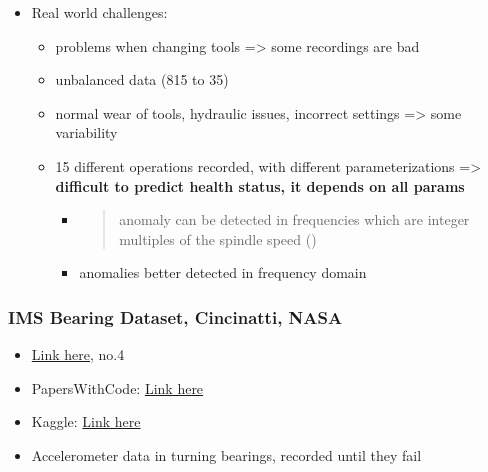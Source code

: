 \documentclass[
  letterpaper,
  DIV=11,
  numbers=noendperiod]{scrartcl}
\providecommand{\tightlist}{%
  \setlength{\itemsep}{0pt}\setlength{\parskip}{0pt}}
\begin{document}
\begin{itemize}
  \begin{itemize}
  \tightlist
  \item
    \textbf{Tsfresh}: automatic package to extract standard features
    from time series, open source,
    \href{https://tsfresh.readthedocs.io/en/latest/}{here},
    \href{https://www.sciencedirect.com/science/article/pii/S0925231218304843}{paper
    here}
  \end{itemize}
\item
  Real world challenges:

  \begin{itemize}
  \tightlist
  \item
    problems when changing tools =\textgreater{} some recordings are bad
  \item
    unbalanced data (815 to 35)
  \item
    normal wear of tools, hydraulic issues, incorrect settings
    =\textgreater{} some variability
  \item
    15 different operations recorded, with different parameterizations
    =\textgreater{} \textbf{difficult to predict health status, it
    depends on all params}

    \begin{itemize}
    \item
      \begin{quote}
      anomaly can be detected in frequencies which are integer multiples
      of the spindle speed ()
      \end{quote}
    \item
      anomalies better detected in frequency domain
    \end{itemize}
  \end{itemize}
\end{itemize}

\subsubsection{IMS Bearing Dataset, Cincinatti,
NASA}\label{ims-bearing-dataset-cincinatti-nasa}

\begin{itemize}
\item
  \href{https://www.nasa.gov/content/prognostics-center-of-excellence-data-set-repository}{Link
  here}, no.4
\item
  PapersWithCode:
  \href{https://paperswithcode.com/dataset/ims-bearing-dataset}{Link
  here}
\item
  Kaggle:
  \href{https://www.kaggle.com/datasets/vinayak123tyagi/bearing-dataset}{Link
  here}
\item
  Accelerometer data in turning bearings, recorded until they fail
\end{itemize}
\end{document}
